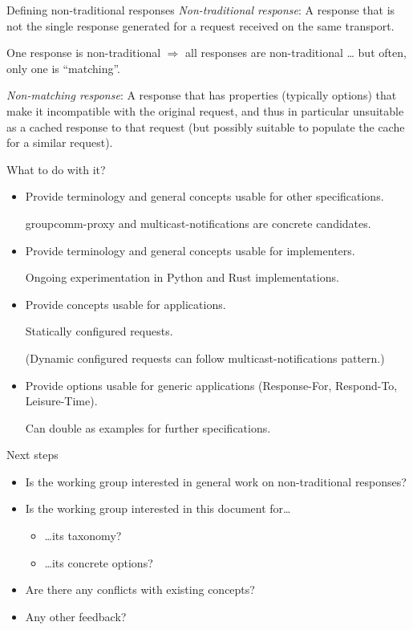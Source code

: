 \documentclass[aspectratio=169]{beamer}
\begin{document}
\begin{frame}{Defining non-traditional responses}\Large
	\textit{Non-traditional response}: A response that is not the single response generated for a request received on the same transport.

	\bigskip

	One response is non-traditional $\Rightarrow$ all responses are non-traditional \ldots{} but often, only one is ``matching''.

	\pause\bigskip

	\textit{Non-matching response}: A response that has properties (typically options) that make it incompatible with the original request, and thus in particular unsuitable as a cached response to that request (but possibly suitable to populate the cache for a similar request).
\end{frame}

\begin{frame}{What to do with it?}\large
	\begin{itemize}
		\item Provide terminology and general concepts usable for other specifications.

			\qquad groupcomm-proxy and multicast-notifications are concrete candidates.
		\item Provide terminology and general concepts usable for implementers.

			\qquad Ongoing experimentation in Python and Rust implementations.
		\item Provide concepts usable for applications.

			\qquad Statically configured requests.

			\qquad (Dynamic configured requests can follow multicast-notifications pattern.)

		\item Provide options usable for generic applications (Response-For, Respond-To, Leisure-Time).

			\qquad Can double as examples for further specifications.
	\end{itemize}
\end{frame}

\begin{frame}{Next steps}\Large 
	\begin{itemize}
		\item Is the working group interested in general work on non-traditional responses?
		\item Is the working group interested in this document for\ldots
			\begin{itemize}
				\item \Large \ldots its taxonomy?
				\item \Large \ldots its concrete options?
			\end{itemize}
		\item Are there any conflicts with existing concepts?
		\item Any other feedback?
	\end{itemize}

\end{frame}

\end{document}
